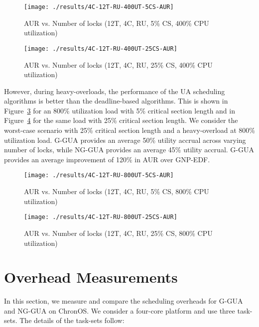 \documentclass[12pt,dvips]{report}
\begin{document}
\begin{figure} [htbp]
  \centering
  \texttt{[image: ./results/4C-12T-RU-400UT-5CS-AUR]}
  \caption{AUR vs. Number of locks (12T, 4C, RU, 5\% CS, 400\% CPU utilization) }
    \label{fig:4C-12T-RU-400UT-5CS-AUR}
\end{figure}


\begin{figure} [htbp]
  \centering
  \texttt{[image: ./results/4C-12T-RU-400UT-25CS-AUR]}
  \caption{AUR vs. Number of locks (12T, 4C, RU, 25\% CS, 400\% CPU utilization) }
    \label{fig:4C-12T-RU-400UT-25CS-AUR}
\end{figure}

However, during heavy-overloads, the performance of the UA scheduling algorithms is better than the deadline-based algorithms. This is shown in Figure~\ref{fig:4C-12T-RU-800UT-5CS-AUR} for an 800\% utilization load with 5\% critical section length and in Figure~\ref{fig:4C-12T-RU-800UT-25CS-AUR} for the same load with 25\% critical section length. We consider the worst-case scenario with 25\% critical section length and a heavy-overload at 800\% utilization load. G-GUA provides an average 50\% utility accrual across varying number of locks, while NG-GUA provides an average 45\% utility accrual. G-GUA provides an average improvement of 120\% in AUR over GNP-EDF.
 
\begin{figure} [htbp]
  \centering
  \texttt{[image: ./results/4C-12T-RU-800UT-5CS-AUR]}
  \caption{AUR vs. Number of locks (12T, 4C, RU, 5\% CS, 800\% CPU utilization) }
    \label{fig:4C-12T-RU-800UT-5CS-AUR}
\end{figure}
 
\begin{figure} [htbp]
  \centering
  \texttt{[image: ./results/4C-12T-RU-800UT-25CS-AUR]}
  \caption{AUR vs. Number of locks (12T, 4C, RU, 25\% CS, 800\% CPU utilization)}
    \label{fig:4C-12T-RU-800UT-25CS-AUR}
\end{figure}
 
\pagebreak

\section{Overhead Measurements}\label{sec:overheads}

In this section, we measure and compare the scheduling overheads for G-GUA and NG-GUA on ChronOS. We consider a four-core platform and use three task-sets. The details of the task-sets follow:
\end{document}
